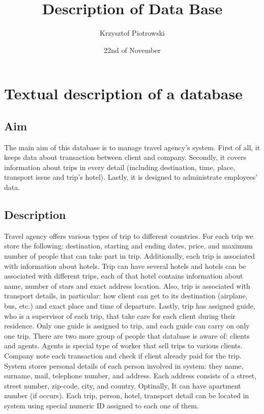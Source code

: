 \documentclass{article}
\title{Description of Data Base}
\author{Krzysztof Piotrowski}
\date{22nd of November}
\begin{document}
\maketitle
\section{Textual description of a database}
\subsection{Aim}
The main aim of this database is to manage travel agency's system.
First of all, it keeps data about transaction between client and company.
Secondly, it covers information about trips in every detail
(including destination, time, place, transport issue and trip's hotel).
Lastly, it is designed to administrate employees' data.
\subsection{Description}
Travel agency offers various types of trip to different countries.
For each trip we store the following: destination, starting and ending dates, price, and maximum number of people that can take part in trip.
Additionally, each trip is associated with information about hotels. Trip can have several hotels and hotels can be associated with different trips, each of that hotel contains information about name, number of stars and exact address location.
Also, trip is associated with transport details, in particular: how client can get to its destination (airplane, bus, etc.) and exact place and time of departure.
Lastly, trip has assigned guide, who is a supervisor of each trip, that take care for each client during their residence. Only one guide is assigned to trip, and each guide can carry on only one trip.
There are two more group of people that database is aware of: clients and agents.
Agents is special type of worker that sell trips to various clients. Company note each transaction and check if client already paid for the trip.
System stores personal details of each person involved in system: they name, surname, mail, telephone number, and address.
Each address consists of a street, street number, zip-code, city, and country. Optinally, It can have apartment number (if occurs).
Each trip, person, hotel, transport detail can be located in system using special numeric ID assigned to each one of them.
\end{document}
